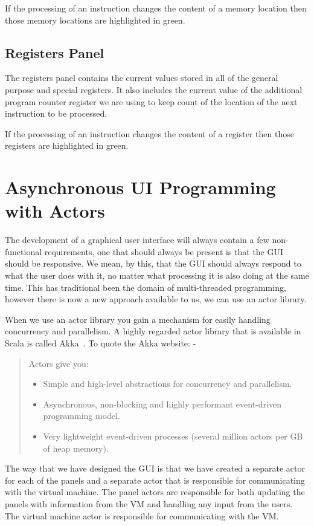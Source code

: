 \documentclass[a4paper,11pt]{report}
\begin{document}
If the processing of an instruction changes the content of a memory location then those memory locations are highlighted in green.
\subsection{Registers Panel}
The registers panel contains the current values stored in all of the general purpose and special registers. It also includes the current value of the additional program counter register we are using to keep count of the location of the next instruction to be processed.

If the processing of an instruction changes the content of a register then those registers are highlighted in green.
\section{Asynchronous UI Programming with Actors}
The development of a graphical user interface will always contain a few non-functional requirements, one that should always be present is that the GUI should be responsive. We mean, by this, that the GUI should always respond to what the user does with it, no matter what processing it is also doing at the same time. This has traditional been the domain of multi-threaded programming, however there is now a new approach available to us, we can use an actor library. 

When we use an actor library you gain a mechanism for easily handling concurrency and parallelism.  A highly regarded actor library that is available in Scala is called Akka~\cite{akka}. To quote the Akka website: -

\begin{quotation}
Actors give you:

\begin{itemize}
\item Simple and high-level abstractions for concurrency and parallelism.
\item Asynchronous, non-blocking and highly performant event-driven programming model.
\item Very lightweight event-driven processes (several million actors per GB of heap memory).
\end{itemize}
\end{quotation}

The way that we have designed the GUI is that we have created a separate actor for each of the panels and a separate actor that is responsible for communicating with the virtual machine. The panel actors are responsible for both updating the panels with information from the VM and handling any input from the users. The virtual machine actor is responsible for communicating with the VM.
\end{document}
